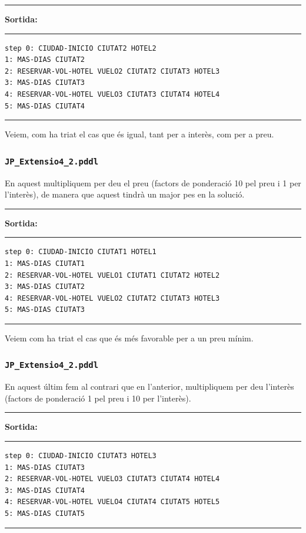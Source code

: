 \documentclass[11pt,a4paper]{article}
\begin{document}
\begin{samepage}
\medskip
\noindent
\rule{0.1\textwidth}{0.5mm}
\textbf{Sortida:}
\rule{0.76\textwidth}{0.5mm}
\begin{verbatim}
step 0: CIUDAD-INICIO CIUTAT2 HOTEL2
1: MAS-DIAS CIUTAT2
2: RESERVAR-VOL-HOTEL VUELO2 CIUTAT2 CIUTAT3 HOTEL3
3: MAS-DIAS CIUTAT3
4: RESERVAR-VOL-HOTEL VUELO3 CIUTAT3 CIUTAT4 HOTEL4
5: MAS-DIAS CIUTAT4
\end{verbatim}
\rule{\textwidth}{0.5mm}
\medskip
\end{samepage}

Veiem, com ha triat el cas que és igual, tant per a interès, com per a preu.

\subsubsection*{\texttt{JP\_Extensio4\_2.pddl}}

En aquest multipliquem per deu el preu (factors de ponderació 10 pel preu i 1 per l'interès), de manera que aquest tindrà un major pes en la solució.

\begin{samepage}
\medskip
\noindent
\rule{0.1\textwidth}{0.5mm}
\textbf{Sortida:}
\rule{0.76\textwidth}{0.5mm}
\begin{verbatim}
step 0: CIUDAD-INICIO CIUTAT1 HOTEL1
1: MAS-DIAS CIUTAT1
2: RESERVAR-VOL-HOTEL VUELO1 CIUTAT1 CIUTAT2 HOTEL2
3: MAS-DIAS CIUTAT2
4: RESERVAR-VOL-HOTEL VUELO2 CIUTAT2 CIUTAT3 HOTEL3
5: MAS-DIAS CIUTAT3
\end{verbatim}
\rule{\textwidth}{0.5mm}
\medskip
\end{samepage}

Veiem com ha triat el cas que és més favorable per a un preu mínim.

\subsubsection*{\texttt{JP\_Extensio4\_2.pddl}}

En aquest últim fem al contrari que en l'anterior, multipliquem per deu l'interès (factors de ponderació 1 pel preu i 10 per l'interès).

\begin{samepage}
\medskip
\noindent
\rule{0.1\textwidth}{0.5mm}
\textbf{Sortida:}
\rule{0.76\textwidth}{0.5mm}
\begin{verbatim}
step 0: CIUDAD-INICIO CIUTAT3 HOTEL3
1: MAS-DIAS CIUTAT3
2: RESERVAR-VOL-HOTEL VUELO3 CIUTAT3 CIUTAT4 HOTEL4
3: MAS-DIAS CIUTAT4
4: RESERVAR-VOL-HOTEL VUELO4 CIUTAT4 CIUTAT5 HOTEL5
5: MAS-DIAS CIUTAT5
\end{verbatim}
\rule{\textwidth}{0.5mm}
\medskip
\end{samepage}
\end{document}

